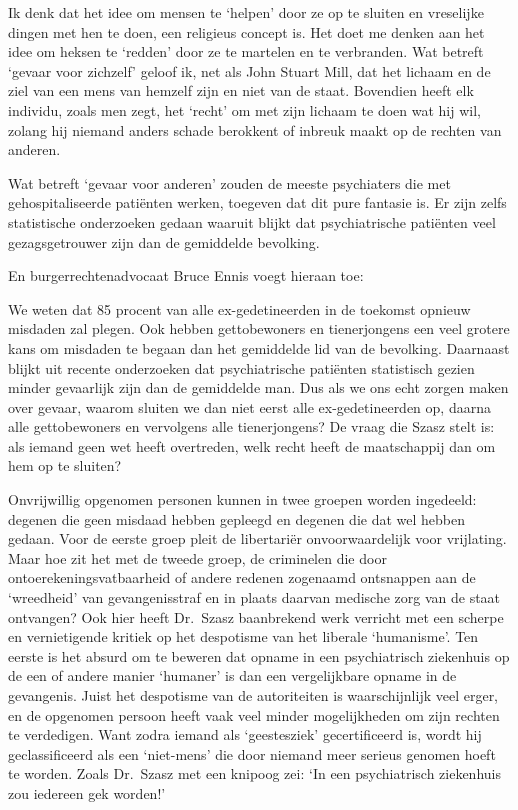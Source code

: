\documentclass[
  a5paper,
  smalldemyvopaper,10pt,twoside,onecolumn,openright,extrafontsizes,hidelinks]{memoir}
\renewenvironment{quote}%
               {\list{}{\rightmargin=.6cm\leftmargin=.6cm}%
                \itshape \item[]}%
               {\endlist}
\begin{document}
\begin{quote}
Ik denk dat het idee om mensen te `helpen' door ze op te sluiten en
vreselijke dingen met hen te doen, een religieus concept is. Het doet me
denken aan het idee om heksen te `redden' door ze te martelen en te
verbranden. Wat betreft `gevaar voor zichzelf' geloof ik, net als John
Stuart Mill, dat het lichaam en de ziel van een mens van hemzelf zijn en
niet van de staat. Bovendien heeft elk individu, zoals men zegt, het
`recht' om met zijn lichaam te doen wat hij wil, zolang hij niemand
anders schade berokkent of inbreuk maakt op de rechten van anderen.

Wat betreft `gevaar voor anderen' zouden de meeste psychiaters die met
gehospitaliseerde patiënten werken, toegeven dat dit pure fantasie is.
Er zijn zelfs statistische onderzoeken gedaan waaruit blijkt dat
psychiatrische patiënten veel gezagsgetrouwer zijn dan de gemiddelde
bevolking.
\end{quote}

En burgerrechtenadvocaat Bruce Ennis voegt hieraan toe:

\begin{quote}
We weten dat 85 procent van alle ex-gedetineerden in de toekomst opnieuw
misdaden zal plegen. Ook hebben gettobewoners en tienerjongens een veel
grotere kans om misdaden te begaan dan het gemiddelde lid van de
bevolking. Daarnaast blijkt uit recente onderzoeken dat psychiatrische
patiënten statistisch gezien minder gevaarlijk zijn dan de gemiddelde
man. Dus als we ons echt zorgen maken over gevaar, waarom sluiten we dan
niet eerst alle ex-gedetineerden op, daarna alle gettobewoners en
vervolgens alle tienerjongens? De vraag die Szasz stelt is: als iemand
geen wet heeft overtreden, welk recht heeft de maatschappij dan om hem
op te sluiten?
\end{quote}

Onvrijwillig opgenomen personen kunnen in twee groepen worden ingedeeld:
degenen die geen misdaad hebben gepleegd en degenen die dat wel hebben
gedaan. Voor de eerste groep pleit de libertariër onvoorwaardelijk voor
vrijlating. Maar hoe zit het met de tweede groep, de criminelen die door
ontoerekeningsvatbaarheid of andere redenen zogenaamd ontsnappen aan de
`wreedheid' van gevangenisstraf en in plaats daarvan medische zorg van
de staat ontvangen? Ook hier heeft Dr.~Szasz baanbrekend werk verricht
met een scherpe en vernietigende kritiek op het despotisme van het
liberale `humanisme'. Ten eerste is het absurd om te beweren dat opname
in een psychiatrisch ziekenhuis op de een of andere manier `humaner' is
dan een vergelijkbare opname in de gevangenis. Juist het despotisme van
de autoriteiten is waarschijnlijk veel erger, en de opgenomen persoon
heeft vaak veel minder mogelijkheden om zijn rechten te verdedigen. Want
zodra iemand als `geestesziek' gecertificeerd is, wordt hij
geclassificeerd als een `niet-mens' die door niemand meer serieus
genomen hoeft te worden. Zoals Dr.~Szasz met een knipoog zei: `In een
psychiatrisch ziekenhuis zou iedereen gek worden!'
\end{document}

